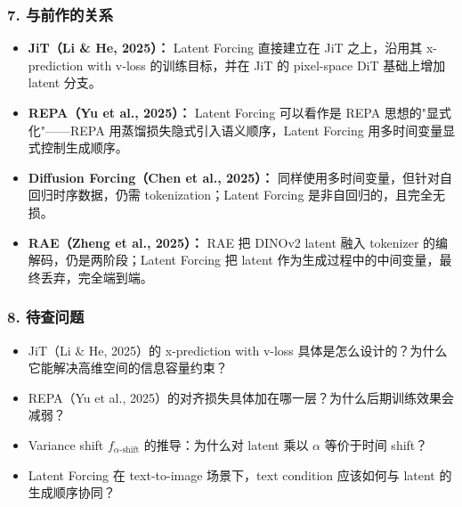 \subsubsection{7. 与前作的关系}

\begin{itemize}[leftmargin=1.5em]
  \item \textbf{JiT（Li \& He, 2025）：} Latent Forcing 直接建立在 JiT 之上，沿用其 x-prediction with v-loss 的训练目标，并在 JiT 的 pixel-space DiT 基础上增加 latent 分支。
  \item \textbf{REPA（Yu et al., 2025）：} Latent Forcing 可以看作是 REPA 思想的"显式化"——REPA 用蒸馏损失隐式引入语义顺序，Latent Forcing 用多时间变量显式控制生成顺序。
  \item \textbf{Diffusion Forcing（Chen et al., 2025）：} 同样使用多时间变量，但针对自回归时序数据，仍需 tokenization；Latent Forcing 是非自回归的，且完全无损。
  \item \textbf{RAE（Zheng et al., 2025）：} RAE 把 DINOv2 latent 融入 tokenizer 的编解码，仍是两阶段；Latent Forcing 把 latent 作为生成过程中的中间变量，最终丢弃，完全端到端。
\end{itemize}

\subsubsection{8. 待查问题}

\begin{itemize}[leftmargin=1.5em]
  \item JiT（Li \& He, 2025）的 x-prediction with v-loss 具体是怎么设计的？为什么它能解决高维空间的信息容量约束？
  \item REPA（Yu et al., 2025）的对齐损失具体加在哪一层？为什么后期训练效果会减弱？
  \item Variance shift $f_{\alpha\text{-shift}}$ 的推导：为什么对 latent 乘以 $\alpha$ 等价于时间 shift？
  \item Latent Forcing 在 text-to-image 场景下，text condition 应该如何与 latent 的生成顺序协同？
\end{itemize}
